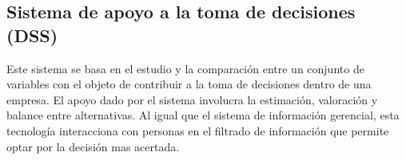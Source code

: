 \setlength{\parskip}{0mm}

\subsection{Sistema de apoyo a la toma de decisiones (DSS)}
\setlength{\parskip}{5mm}

Este sistema se basa en el estudio y la comparación entre un conjunto de variables con el objeto de contribuir a la toma de decisiones dentro de una empresa. El apoyo dado por el sistema involucra la estimación, valoración y balance entre alternativas. Al igual que el sistema de información gerencial, esta tecnología interacciona con personas en el filtrado de información que permite optar por la decisión mas acertada.










